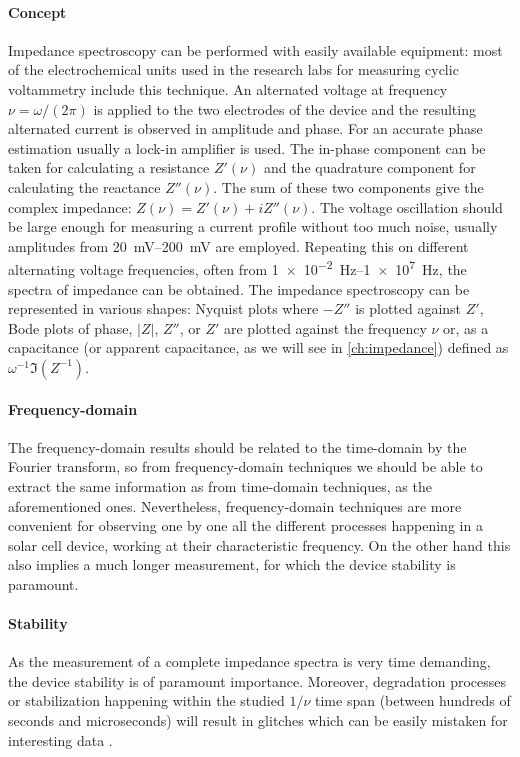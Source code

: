 	\paragraph{Concept}
	Impedance spectroscopy can be performed with easily available equipment: most of the electrochemical units used in the research labs for measuring cyclic voltammetry include this technique.
	An alternated voltage at frequency $\nu = \omega / (2 \pi)$ is applied to the two electrodes of the device and the resulting alternated current is observed in amplitude and phase.
	For an accurate phase estimation usually a lock-in amplifier is used.
	The in-phase component can be taken for calculating a resistance $Z'(\nu)$ and the quadrature component for calculating the reactance $Z''(\nu)$.
	The sum of these two components give the complex impedance: $Z(\nu) = Z'(\nu) + iZ''(\nu)$.
	The voltage oscillation should be large enough for measuring a current profile without too much noise, usually amplitudes from \SIrange{20}{200}{\mV} are employed.
	Repeating this on different alternating voltage frequencies, often from \SIrange{1e-2}{1e7}{\Hz}, the spectra of impedance can be obtained.
	The impedance spectroscopy can be represented in various shapes: Nyquist plots where $-Z''$ is plotted against $Z'$, Bode plots of phase, $|Z|$, $Z''$, or $Z'$ are plotted against the frequency $\nu$ or, as a capacitance (or apparent capacitance, as we will see in \cref{ch:impedance}) defined as $\omega^{-1}\Im(Z^{-1})$.

	\paragraph{Frequency\hyp{}domain}
The frequency\hyp{}domain results should be related to the time\hyp{}domain by the Fourier transform, so from frequency\hyp{}domain techniques we should be able to extract the same information as from time\hyp{}domain techniques, as the aforementioned ones.
Nevertheless, frequency\hyp{}domain techniques are more convenient for observing one by one all the different processes happening in a solar cell device, working at their characteristic frequency.
On the other hand this also implies a much longer measurement, for which the device stability is paramount.

	\paragraph{Stability}
	As the measurement of a complete impedance spectra is very time demanding, the device stability is of paramount importance.
	Moreover, degradation processes or stabilization happening within the studied $1/\nu$ time span (between hundreds of seconds and microseconds) will result in glitches which can be easily mistaken for interesting data \cite{Jacobs2018,Moia2019}.

